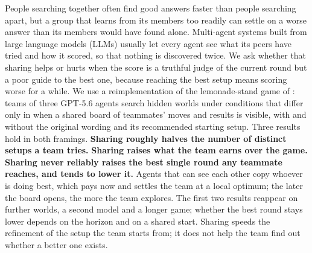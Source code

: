 People searching together often find good answers faster than people searching apart, but a group that learns
from its members too readily can settle on a worse answer than its members would have found alone. Multi-agent systems built from large language
models (LLMs) usually let every agent see what its peers have tried and how it scored, so that nothing
is discovered twice. We ask whether that sharing helps or hurts when the score is a truthful judge of the
current round but a poor guide to the best one, because reaching the best setup means scoring worse for
a while. We use a reimplementation of the lemonade-stand game of \citet{ederer2013pay}: teams of three
GPT-5.6 agents search hidden worlds under conditions that differ only in when a shared board of teammates'
moves and results is visible, with and without the original wording and its recommended starting setup. Three
results hold in both framings. \textbf{Sharing roughly halves the number of distinct setups a team tries.}
\textbf{Sharing raises what the team earns over the game.} \textbf{Sharing never reliably raises the best
single round any teammate reaches, and tends to lower it.} Agents that can see each other copy whoever is
doing best, which pays now and settles the team at a local optimum; the later the board opens, the more the
team explores. The first two results reappear on further worlds, a second model and a longer game; whether
the best round stays lower depends on the horizon and on a shared start. Sharing speeds the refinement of
the setup the team starts from; it does not help the team find out whether a better one exists.

